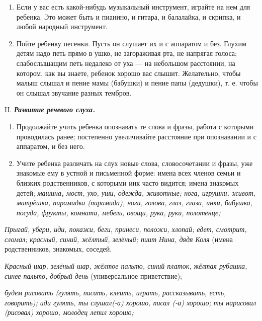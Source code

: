 \documentclass{book}
\renewcommand{\emph}[1]{\textit{#1}}
\begin{document}
\begin{enumerate}
\item
  
  Если у вас есть какой-нибудь музыкальный инструмент, играйте на нем
  для ребенка. Это может быть и пианино, и гитара, и балалайка, и
  скрипка, и любой народный инструмент.
  
\item
  
  Пойте ребенку песенки. Пусть он слушает их и с аппаратом и без. Глухим
  детям надо петь прямо в ушко, не загораживая рта, не напрягая голоса;
  слабослышащим петь недалеко от уха --- на небольшом расстоянии, на
  котором, как вы знаете, ребенок хорошо вас слышит. Желательно, чтобы
  малыш слышал и пение мамы (бабушки) и пение папы (дедушки), т. е.
  чтобы он слышал звучание разных тембров.
  
\end{enumerate}


II. \emph{\textbf{Развитие речевого слуха.}}


\begin{enumerate}
\def\labelenumi{\arabic{enumi}.}
\item
  
  Продолжайте учить ребенка опознавать те слова и фразы, работа с
  которыми проводилась ранее; постепенно увеличивайте расстояние при
  опознавании и с аппаратом, и без него.
  
\item
  
  Учите ребенка различать на слух новые слова, словосочетании и фразы,
  уже знакомые ему в устной и письменной форме: имена всех членов семьи
  и близких родственников, с которыми инк часто видится; имена знакомых
  детей; \emph{машина\textbf{,} мост, ухо, уши, одежда, животные; нога,
  игрушки, живот, матрёшка, пирамидка (пирамида), ноги, голова, глаз,
  глаза, инки, бабушка, посуда, фрукты, комната, мебель, овощи, рука,
  руки, полотенце;}
  
\end{enumerate}


\emph{Прыгай, убери, иди, покажи, беги, принеси, положи, хлопай; едет,
смотрит, сломал; красный, синий, жёлтый, зелёный; пиит Нина, дядя Коля}
(имена родственников, знакомых, соседей.

\emph{Красный шар, зелёный шар, жёлтое пальто, синий платок,}
ж\emph{ёлтая рубашка, синее пальто, добрый день} (универсальное
приветствие);

\emph{будем рисовать (гулять, писать, клеить, играть, рассказывать,
есть, говорить); иди гулять, ты слушал(-а) хорошо, писал (-а) хорошо; ты
нарисовал (рисовал) хорошо, молодец лепил хорошо;}
\end{document}
